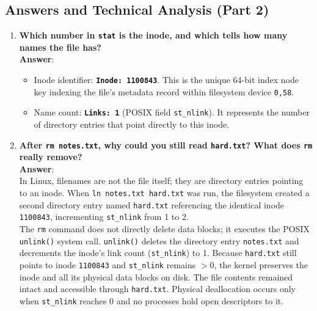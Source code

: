 \documentclass[12pt,a4paper]{article}
\begin{document}
\subsection{Answers and Technical Analysis (Part 2)}

\begin{enumerate}
    \item \textbf{Which number in \texttt{stat} is the inode, and which tells how many names the file has?} \\
    \textbf{Answer}:
    \begin{itemize}
        \item Inode identifier: \textbf{\texttt{Inode: 1100843}}. This is the unique 64-bit index node key indexing the file's metadata record within filesystem device \texttt{0,58}.
        \item Name count: \textbf{\texttt{Links: 1}} (POSIX field \texttt{st\_nlink}). It represents the number of directory entries that point directly to this inode.
    \end{itemize}

    \item \textbf{After \texttt{rm notes.txt}, why could you still read \texttt{hard.txt}? What does \texttt{rm} really remove?} \\
    \textbf{Answer}: \\
    In Linux, filenames are not the file itself; they are directory entries pointing to an inode. When \texttt{ln notes.txt hard.txt} was run, the filesystem created a second directory entry named \texttt{hard.txt} referencing the identical inode \texttt{1100843}, incrementing \texttt{st\_nlink} from 1 to 2. \\
    The \texttt{rm} command does not directly delete data blocks; it executes the POSIX \texttt{unlink()} system call. \texttt{unlink()} deletes the directory entry \texttt{notes.txt} and decrements the inode's link count (\texttt{st\_nlink}) to 1. Because \texttt{hard.txt} still points to inode \texttt{1100843} and \texttt{st\_nlink} remains $> 0$, the kernel preserves the inode and all its physical data blocks on disk. The file contents remained intact and accessible through \texttt{hard.txt}. Physical deallocation occurs only when \texttt{st\_nlink} reaches 0 and no processes hold open descriptors to it.


\end{enumerate}
\end{document}
